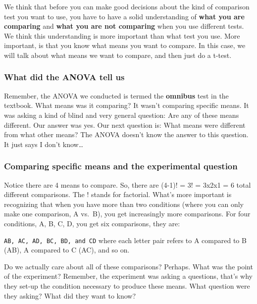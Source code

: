 \documentclass[
]{book}
\begin{document}
We think that before you can make good decisions about the kind of comparison test you want to use, you have to have a solid understanding of \textbf{what you are comparing} and \textbf{what you are not comparing} when you use different tests. We think this understanding is more important than what test you use. More important, is that you know what means you want to compare. In this case, we will talk about what means we want to compare, and then just do a t-test.

\hypertarget{what-did-the-anova-tell-us}{%
\subsubsection{What did the ANOVA tell us}\label{what-did-the-anova-tell-us}}

Remember, the ANOVA we conducted is termed the \textbf{omnibus} test in the textbook. What means was it comparing? It wasn't comparing specific means. It was asking a kind of blind and very general question: Are any of these means different. Our answer was yes. Our next question is: What means were different from what other means? The ANOVA doesn't know the answer to this question. It just says I don't know\ldots{}

\hypertarget{comparing-specific-means-and-the-experimental-question}{%
\subsubsection{Comparing specific means and the experimental question}\label{comparing-specific-means-and-the-experimental-question}}

Notice there are 4 means to compare. So, there are (4-1)! = 3! = 3x2x1 = 6 total different comparisons. The ! stands for factorial. What's more important is recognizing that when you have more than two conditions (where you can only make one comparison, A vs.~B), you get increasingly more comparisons. For four conditions, A, B, C, D, you get six comparisons, they are:

\texttt{AB,\ AC,\ AD,\ BC,\ BD,\ and\ CD} where each letter pair refers to A compared to B (AB), A compared to C (AC), and so on.

Do we actually care about all of these comparisons? Perhaps. What was the point of the experiment? Remember, the experiment was asking a questions, that's why they set-up the condition necessary to produce these means. What question were they asking? What did they want to know?
\end{document}
